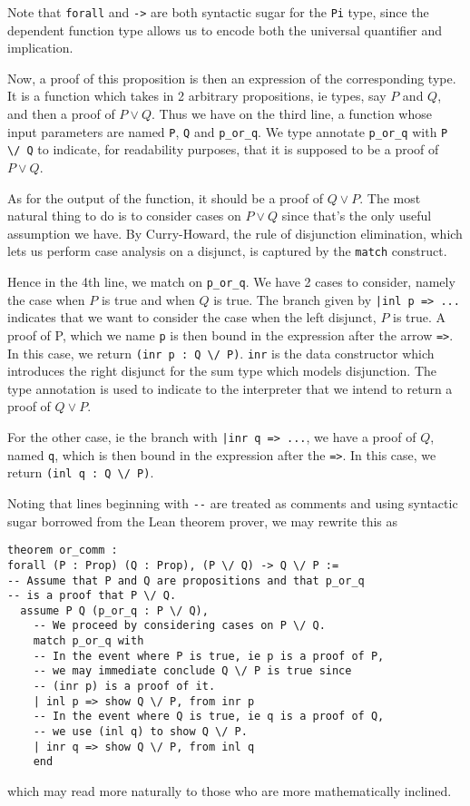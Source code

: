 \documentclass{article}
\begin{document}
Note that \verb|forall| and \verb|->| are both
syntactic sugar for the \verb|Pi| type, since the dependent function type
allows us to encode both the universal quantifier and implication.

Now, a proof of this proposition is then an expression of the corresponding type.
It is a function which takes in 2 arbitrary propositions, ie types, say
$P$ and $Q$, and then a proof of $P \vee Q$. 
Thus we have on the third line, a function whose input parameters are named
\verb|P|, \verb|Q| and \verb|p_or_q|. We type annotate \verb|p_or_q| with
\verb|P \/ Q| to indicate, for readability purposes, that it is supposed to be
a proof of $P \vee Q$.

As for the output of the function, it should be a proof of $Q \vee P$. The
most natural thing to do is to consider cases on $P \vee Q$ since that's the
only useful assumption we have.
By Curry-Howard, the rule of disjunction elimination, which lets us perform
case analysis on a disjunct, is captured by the \verb|match| construct.

Hence in the 4th line, we match on \verb|p_or_q|. We have 2 cases to consider,
namely the case when $P$ is true and when $Q$ is true.
The branch given by \verb#|inl p => ...# indicates that we want to consider the
case when the left disjunct, $P$ is true. A proof of P, which we name \verb|p|
is then bound in the expression after the arrow \verb|=>|.
In this case, we return \verb|(inr p : Q \/ P)|. \verb|inr| is the data constructor
which introduces the right disjunct for the sum type which models disjunction.
The type annotation is used to indicate to the interpreter that we intend to
return a proof of $Q \vee P$.

For the other case, ie the branch with \verb#|inr q => ...#, we have a proof of
$Q$, named \verb|q|, which is then bound in the expression after the \verb|=>|.
In this case, we return \verb|(inl q : Q \/ P)|.

Noting that lines beginning with \verb|--| are treated as comments and 
using syntactic sugar borrowed from the Lean theorem prover, we may rewrite this
as
\begin{verbatim}
theorem or_comm :
forall (P : Prop) (Q : Prop), (P \/ Q) -> Q \/ P :=
-- Assume that P and Q are propositions and that p_or_q 
-- is a proof that P \/ Q.
  assume P Q (p_or_q : P \/ Q),
    -- We proceed by considering cases on P \/ Q.
    match p_or_q with
    -- In the event where P is true, ie p is a proof of P,
    -- we may immediate conclude Q \/ P is true since 
    -- (inr p) is a proof of it.
    | inl p => show Q \/ P, from inr p
    -- In the event where Q is true, ie q is a proof of Q,
    -- we use (inl q) to show Q \/ P. 
    | inr q => show Q \/ P, from inl q
    end
\end{verbatim}
which may read more naturally to those who are more mathematically inclined.
\end{document}
